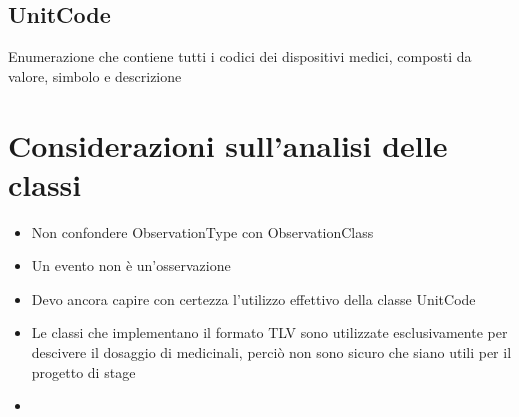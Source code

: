\documentclass[a4paper]{article}
\begin{document}
        \subsection{UnitCode}
            Enumerazione che contiene tutti i codici dei dispositivi medici, composti da valore, simbolo e descrizione
    \section{Considerazioni sull'analisi delle classi}
        \begin{itemize}
            \item Non confondere ObservationType con ObservationClass
            \item Un evento non è un'osservazione
            \item Devo ancora capire con certezza l'utilizzo effettivo della classe UnitCode
            \item Le classi che implementano il formato TLV sono utilizzate esclusivamente per descivere il dosaggio di medicinali, perciò non sono sicuro che siano utili per il progetto di stage
            \item 
        \end{itemize}
\end{document}
